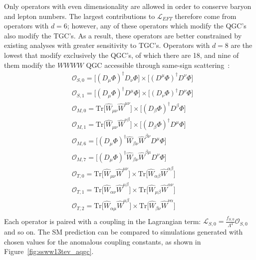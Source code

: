 
Only operators with even dimensionality are allowed in order to conserve baryon and lepton numbers.
The largest contributions to $\mathcal{L}_{EFT}$ therefore come from operators with $d=6$; however, any of these operators which modify the QGC's also modify the TGC's.
As a result, these operators are better constrained by existing analyses with greater sensitivity to TGC's.
Operators with $d=8$ are the lowest that modify exclusively the QGC's, of which there are 18, and nine of them modify the $WWWW$ QGC accessible through same-sign \sswwnojj scattering~\cite{2006.aqgc-at-lhc, 2013.aqgc-mc}:
\begin{equation}
  \begin{aligned}
    &\mathcal{O}_{S,0} = \big[(D_\mu\Phi)^\dagger D_\nu\Phi\big]\times\big[(D^\mu\Phi)^\dagger D^\nu\Phi\big]\\
    &\mathcal{O}_{S,1} = \big[(D_\mu\Phi)^\dagger D^\mu\Phi\big]\times\big[(D_\nu\Phi)^\dagger D^\nu\Phi\big]\\
    &\mathcal{O}_{M,0} = \textrm{Tr}\big[\hat{W}_{\mu\nu}\hat{W}^{\mu\nu}\big]\times\big[(D_\beta\Phi)^\dagger D^\beta\Phi\big]\\
    &\mathcal{O}_{M,1} = \textrm{Tr}\big[\hat{W}_{\mu\nu}\hat{W}^{\nu\beta}\big]\times\big[(D_\beta\Phi)^\dagger D^\mu\Phi\big]\\
    &\mathcal{O}_{M,6} = \big[(D_\mu\Phi)^\dagger\hat{W}_{\beta\nu}\hat{W}^{\beta\nu}D^\mu\Phi\big]\\
    &\mathcal{O}_{M,7} = \big[(D_\mu\Phi)^\dagger\hat{W}_{\beta\nu}\hat{W}^{\beta\mu}D^\nu\Phi\big]\\
    &\mathcal{O}_{T,0} = \textrm{Tr}\big[\hat{W}_{\mu\nu}\hat{W}^{\mu\nu}\big]\times\textrm{Tr}\big[\hat{W}_{\alpha\beta}\hat{W}^{\alpha\beta}\big]\\
    &\mathcal{O}_{T,1} = \textrm{Tr}\big[\hat{W}_{\alpha\nu}\hat{W}^{\mu\beta}\big]\times\textrm{Tr}\big[\hat{W}_{\mu\beta}\hat{W}^{\alpha\nu}\big]\\
    &\mathcal{O}_{T,2} = \textrm{Tr}\big[\hat{W}_{\alpha\mu}\hat{W}^{\mu\beta}\big]\times\textrm{Tr}\big[\hat{W}_{\beta\nu}\hat{W}^{\nu\alpha}\big]\\
  \end{aligned}
  \label{eq:aqgc_dim8}
\end{equation}
Each operator is paired with a coupling in the Lagrangian term: $\mathcal{L}_{S,0} = \frac{f_{S,0}}{\Lambda^4}\mathcal{O}_{S,0}$ and so on.
The SM prediction can be compared to simulations generated with chosen values for the anomalous coupling constants, as shown in Figure~\ref{fig:ssww13tev_aqgc}.


